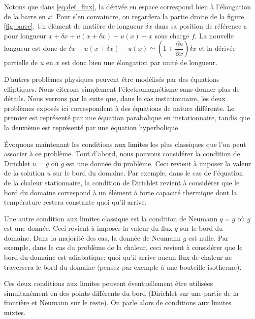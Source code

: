\documentclass[12pt,a4paper,twoside]{article}
\begin{document}
Notons que dans \eqref{eq:def_flux}, la d\'eriv\'ee en espace correspond bien \`a 
l'\'elongation de la barre en $x$. Pour s'en convaincre, on regardera la 
partie droite de la figure \ref{fig:barre}. Un \'el\'ement de mati\`ere de longueur
$\delta x$ dans sa position de r\'ef\'erence a pour longueur 
$x + \delta x + u(x+\delta x) - u(x) - x$ sous charge $f$.
La nouvelle longueur est donc de $\delta x + u(x+\delta x) - u(x) 
\simeq \left(1 + \dfrac{\partial u}{\partial x} \right) \delta x$
et la d\'eriv\'ee partielle de $u$ en $x$ est donc bien une \'elongation par unit\'e de longueur.


D'autres probl\`emes physiques peuvent \^etre mod\'elis\'es par des \'equations elliptiques.
Nous citerons simplement l'\'electromagn\'etisme sans donner plus de d\'etails.
Nous verrons par la suite que, dans le cas instationnaire,
les deux probl\`emes expos\'es ici correspondent \`a 
des \'equations de nature diff\'erente.
Le premier est repr\'esent\'e par une \'equation parabolique en instationnaire,
tandis que la deuxi\`eme est repr\'esent\'e par une \'equation hyperbolique.


\'Evoquons maintenant les conditions aux limites les plus classiques
que l'on peut associer \`a ce probl\`eme.
Tout d'abord, nous pouvons consid\'erer la condition de Dirichlet
$u = g$ o\`u $g$ est une donn\'ee du probl\`eme. Ceci revient \`a imposer
la valeur de la solution $u$ sur le bord du domaine.
Par exemple, dans le cas de l'\'equation de la chaleur stationnaire,
la condition de Dirichlet revient \`a consid\'erer que le bord du domaine
correspond \`a un \'el\'ement \`a forte capacit\'e thermique
dont la temp\'erature restera constante quoi qu'il arrive.


Une autre condition aux limites classique est la condition de Neumann
$q = g$ o\`u $g$ est une donn\'ee. Ceci revient \`a imposer la valeur
du flux $q$ sur le bord du domaine.
Dans la majorit\'e des cas, la donn\'ee de Neumann $g$ est nulle.
Par exemple, dans le cas du probl\`eme de la chaleur, ceci revient
\`a consid\'erer que le bord du domaine est adiabatique:
quoi qu'il arrive aucun flux de chaleur ne traversera le bord du domaine
(pensez par exemple \`a une bouteille isotherme).


Ces deux conditions aux limites peuvent \'eventuellement \^etre utilis\'ees 
simultan\'ement en des points diff\'erents du bord
(Dirichlet sur une partie de la fronti\`ere et Neumann sur le reste).
On parle alors de conditions aux limites mixtes.
\end{document}
